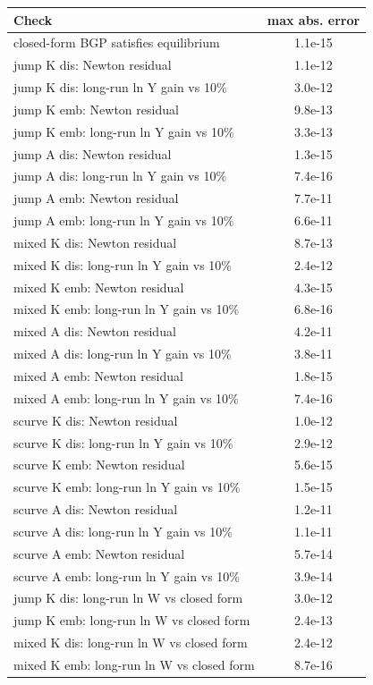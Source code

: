 \begin{tabular}{lc}\toprule Check & max abs. error\\\midrule
closed-form BGP satisfies equilibrium & 1.1e-15\\
jump K dis: Newton residual & 1.1e-12\\
jump K dis: long-run ln Y gain vs 10\% & 3.0e-12\\
jump K emb: Newton residual & 9.8e-13\\
jump K emb: long-run ln Y gain vs 10\% & 3.3e-13\\
jump A dis: Newton residual & 1.3e-15\\
jump A dis: long-run ln Y gain vs 10\% & 7.4e-16\\
jump A emb: Newton residual & 7.7e-11\\
jump A emb: long-run ln Y gain vs 10\% & 6.6e-11\\
mixed K dis: Newton residual & 8.7e-13\\
mixed K dis: long-run ln Y gain vs 10\% & 2.4e-12\\
mixed K emb: Newton residual & 4.3e-15\\
mixed K emb: long-run ln Y gain vs 10\% & 6.8e-16\\
mixed A dis: Newton residual & 4.2e-11\\
mixed A dis: long-run ln Y gain vs 10\% & 3.8e-11\\
mixed A emb: Newton residual & 1.8e-15\\
mixed A emb: long-run ln Y gain vs 10\% & 7.4e-16\\
scurve K dis: Newton residual & 1.0e-12\\
scurve K dis: long-run ln Y gain vs 10\% & 2.9e-12\\
scurve K emb: Newton residual & 5.6e-15\\
scurve K emb: long-run ln Y gain vs 10\% & 1.5e-15\\
scurve A dis: Newton residual & 1.2e-11\\
scurve A dis: long-run ln Y gain vs 10\% & 1.1e-11\\
scurve A emb: Newton residual & 5.7e-14\\
scurve A emb: long-run ln Y gain vs 10\% & 3.9e-14\\
jump K dis: long-run ln W vs closed form & 3.0e-12\\
jump K emb: long-run ln W vs closed form & 2.4e-13\\
mixed K dis: long-run ln W vs closed form & 2.4e-12\\
mixed K emb: long-run ln W vs closed form & 8.7e-16\\

\end{tabular}
